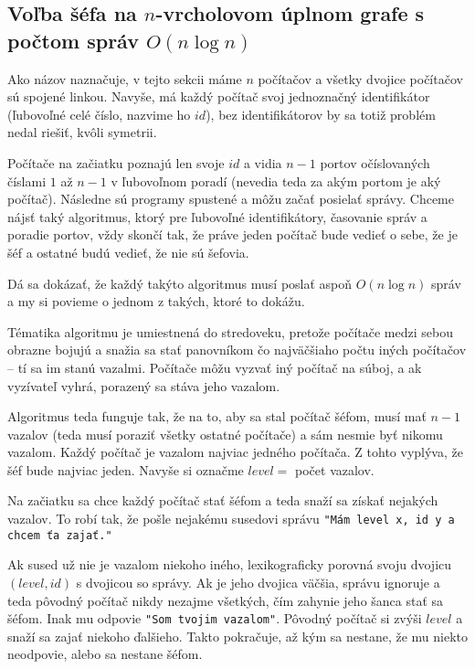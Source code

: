 \subsection{Voľba šéfa na $n$-vrcholovom úplnom grafe s počtom správ $O(n\log n)$}

Ako názov naznačuje, v tejto sekcii máme $n$ počítačov a všetky dvojice počítačov sú spojené linkou. 
Navyše, má každý počítač svoj jednoznačný identifikátor (ľubovoľné celé číslo, nazvime ho $id$), bez identifikátorov
by sa totiž problém nedal riešiť, kvôli symetrii.

Počítače na začiatku poznajú len svoje $id$ a vidia $n-1$ portov očíslovaných číslami $1$ až $n-1$ v
ľubovoľnom poradí (nevedia teda za akým portom je aký počítač). Následne sú programy spustené a môžu začať posielať správy.
Chceme nájsť taký algoritmus, ktorý pre ľubovoľné identifikátory, časovanie správ a poradie
portov, vždy skončí tak, že práve jeden počítač bude vedieť o sebe, že je šéf a ostatné budú vedieť, že nie sú šefovia.

Dá sa dokázať, že každý takýto algoritmus musí poslať aspoň $O(n\log n)$ správ a my si povieme o
jednom z takých, ktoré to dokážu.

Tématika algoritmu je umiestnená do stredoveku, pretože počítače medzi sebou obrazne bojujú a snažia
sa stať panovníkom čo najväčšiaho počtu iných počítačov -- tí sa im stanú vazalmi. 
Počítače môžu vyzvať iný počítač na súboj, a ak vyzívateľ vyhrá, porazený sa stáva jeho vazalom.

Algoritmus teda funguje tak, že na to, aby sa stal počítač šéfom, musí mať $n-1$ vazalov (teda musí
poraziť všetky ostatné počítače) a sám nesmie byť nikomu vazalom. Každý počítač je vazalom najviac 
jedného počítača. Z tohto vyplýva, že šéf bude najviac jeden. Navyše si označme $level =$  počet vazalov.

Na začiatku sa chce každý počítač stať šéfom a teda snaží sa získať nejakých vazalov. To robí tak,
že pošle nejakému susedovi správu \verb!"Mám level x, id y a chcem ťa zajať."! 

Ak sused už nie je vazalom niekoho iného, lexikograficky porovná svoju dvojicu $(level, id)$ s dvojicou so správy. 
Ak je jeho dvojica väčšia, správu ignoruje a teda pôvodný počítač nikdy nezajme všetkých, čím
zahynie jeho šanca stať sa šéfom. 
Inak mu odpovie \verb!"Som tvojim vazalom"!. Pôvodný počítač si zvýši $level$ a snaží sa zajať niekoho
ďalšieho. Takto pokračuje, až kým sa nestane, že mu niekto neodpovie, alebo sa nestane šéfom.

